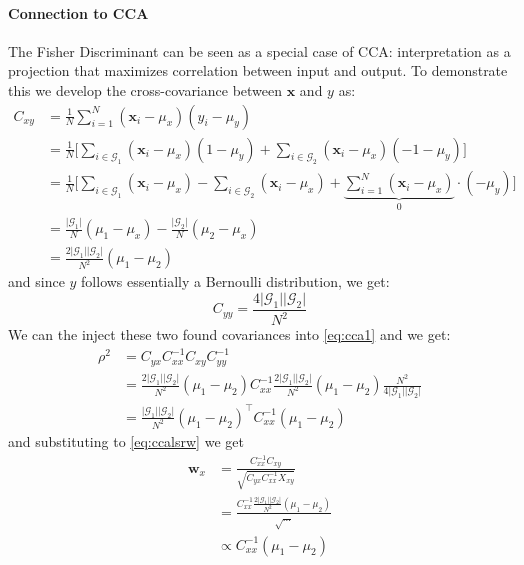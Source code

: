 \paragraph{Connection to CCA}
The Fisher Discriminant  can be seen as a special case of CCA: interpretation as a projection that maximizes correlation between input and output. To demonstrate this we develop the cross-covariance between $\mathbf{x}$ and $y$  as:
\begin{align*}
	C_{xy} & = \frac{1}{N} \sum_{i=1}^{N} (\mathbf{x}_i -\mu_x)(y_i - \mu_y) \\
	& = \frac{1}{N} \bigg[\sum_{i \in \mathcal{G}_1}(\mathbf{x}_i -\mu_x)(1 - \mu_y) + \sum_{i \in \mathcal{G}_2}(\mathbf{x}_i -\mu_x)(-1 - \mu_y)\bigg] \\
	& = \frac{1}{N} \bigg[\sum_{i \in \mathcal{G}_1}(\mathbf{x}_i -\mu_x) - \sum_{i \in \mathcal{G}_2}(\mathbf{x}_i -\mu_x) + \underbrace{\sum_{i=1}^{N}(\mathbf{x}_i - \mu_x)}_0 \cdot (-\mu_y)\bigg] \\
	& = \frac{\lvert \mathcal{G}_1 \rvert}{N} (\mu_1 -\mu_x) - \frac{\lvert \mathcal{G}_2\rvert}{N}(\mu_2 - \mu_x) \\
	& = \frac{2\lvert\mathcal{G}_1\rvert\lvert \mathcal{G}_2\rvert}{N^2}(\mathcal{\mu}_1 - \mu_2)
\end{align*}
and since $y$ follows essentially a Bernoulli distribution, we get:
\begin{equation}
	C_{yy} = \frac{4\lvert\mathcal{G}_1\rvert\lvert \mathcal{G}_2\rvert}{N^2}
\end{equation}
We can the inject these two found covariances into \ref{eq:cca1} and we get:
\begin{align*}
	\rho^2 & = C_{yx}C_{xx}^{-1}C_{xy}C_{yy}^{-1}\\
	& = \frac{2\lvert\mathcal{G}_1\rvert\lvert \mathcal{G}_2\rvert}{N^2}(\mu_1 - \mu_2)C_{xx}^{-1}\frac{2\lvert\mathcal{G}_1\rvert\lvert \mathcal{G}_2\rvert}{N^2}(\mu_1 - \mu_2)\frac{N^2}{4\lvert\mathcal{G}_1\rvert\lvert \mathcal{G}_2\rvert} \\
	& = \frac{\lvert\mathcal{G}_1\rvert\lvert \mathcal{G}_2\rvert}{N^2}(\mu_1 - \mu_2)^\top C_{xx}^{-1}(\mu_1 - \mu_2)
\end{align*}
and substituting to \ref{eq:ccalsrw} we get
\begin{align*}
	\mathbf{w}_x & = \frac{C_{xx}^{-1}C_{xy}}{\sqrt{C_{yx}C_{xx}^{-1}X_{xy}}} \\
	& = \frac{C_{xx}^{-1}\frac{2\lvert\mathcal{G}_1\rvert\lvert \mathcal{G}_2\rvert}{N^2}(\mu_1 - \mu_2)}{\sqrt{\ldots}}\\
	& \propto C_{xx}^{-1}(\mu_1 - \mu_2)
\end{align*}
